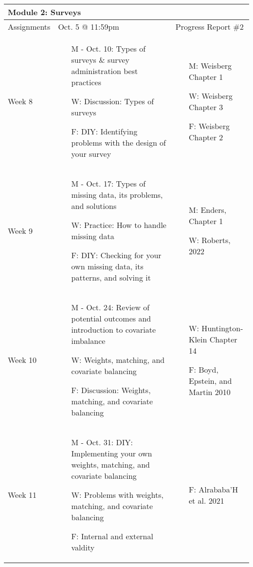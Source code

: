 \documentclass[11pt, a4paper]{article}
\begin{document}
\begin{longtable}[hbt!]{p{}p{}p{}}
        \hline
        \multicolumn{3}{l}{\textbf{Module 2: Surveys}} \\
        \hline
        Assignments & Oct. 5 @ 11:59pm & Progress Report \#2 \\
        \hline
        Week 8 & \begin{itemize} \item[M - Oct. 10:] Types of surveys \& survey administration best practices \item[W:] Discussion: Types of surveys \item[F:] DIY: Identifying problems with the design of your survey \end{itemize} & \begin{itemize} \item[M:] Weisberg Chapter 1 \item[W:] Weisberg Chapter 3 \item[F:] Weisberg Chapter 2 \end{itemize}\\
        \hline 
        Week 9 & \begin{itemize} \item[M - Oct. 17:] Types of missing data, its problems, and solutions \item[W:] Practice: How to handle missing data  \item[F:] DIY: Checking for your own missing data, its patterns, and solving it \end{itemize} & \begin{itemize} \item[M:] Enders, Chapter 1 \item[W:] Roberts, 2022 \end{itemize} \\
        \hline
        Week 10 & \begin{itemize} \item[M - Oct. 24:] Review of potential outcomes and introduction to covariate imbalance \item[W:] Weights, matching, and covariate balancing \item[F:] Discussion: Weights, matching, and covariate balancing \end{itemize} & \begin{itemize} \item[W:] Huntington-Klein Chapter 14 \item[F:] Boyd, Epstein, and Martin 2010 \end{itemize} \\
        \hline 
        Week 11 & \begin{itemize} \item[M - Oct. 31:] DIY: Implementing your own weights, matching, and covariate balancing \item[W:] Problems with weights, matching, and covariate balancing \item[F:] Internal and external valdity \end{itemize} & \begin{itemize} \item[F:] Alrababa'H et al. 2021 \end{itemize} \\

\end{longtable}
\end{document}
